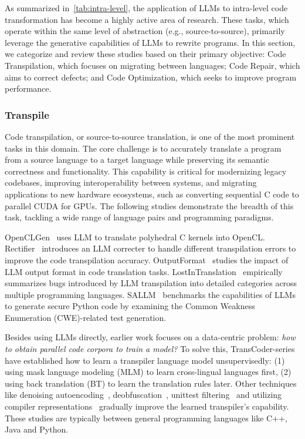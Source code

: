 \documentclass[pdflatex,sn-mathphys-ay,twocolumn, a4paper]{sn-jnl}%
\theoremstyle{thmstyleone}%
\theoremstyle{thmstyletwo}%
\theoremstyle{thmstylethree}%
\begin{document}
As summarized in~\autoref{tab:intra-level}, the application of LLMs to intra-level code transformation has become a highly active area of research. These tasks, which operate within the same level of abstraction (e.g., source-to-source), primarily leverage the generative capabilities of LLMs to rewrite programs. In this section, we categorize and review these studies based on their primary objective: Code Transpilation, which focuses on migrating between languages; Code Repair, which aims to correct defects; and Code Optimization, which seeks to improve program performance.

\subsubsection{Transpile}

Code transpilation, or source-to-source translation, is one of the most prominent tasks in this domain. The core challenge is to accurately translate a program from a source language to a target language while preserving its semantic correctness and functionality. This capability is critical for modernizing legacy codebases, improving interoperability between systems, and migrating applications to new hardware ecosystems, such as converting sequential C code to parallel CUDA for GPUs. The following studies demonstrate the breadth of this task, tackling a wide range of language pairs and programming paradigms.

OpenCLGen~\citep{74_palkowski2024automatic} uses LLM to translate polyhedral C kernels into OpenCL.
Rectifier~\citep{84_yin2024rectifier} introduces an LLM correcter to handle different transpilation errors to improve the code transpilation accuracy.
OutputFormat~\citep{95_macedo2024exploring} studies the impact of LLM output format in code translation tasks.
LostInTranslation~\citep{99_pan2024_ICSE} empirically summarizes bugs introduced by LLM transpilation into detailed categories across multiple programming languages.
SALLM~\citep{146_sallm_asew} benchmarks the capabilities of LLMs to generate secure Python code by examining the Common Weakness Enumeration (CWE)-related test generation.

Besides using LLMs directly, earlier work focuses on a data-centric problem: \textit{how to obtain parallel code corpora to train a model? }
To solve this, TransCoder-series~\citep{177_transcoder, 176_dobf, 175_transcoderst,154_transcoderir2023_iclr} have established how to learn a transpiler language model unsupervisedly: (1) using mask language modeling (MLM) to learn cross-lingual languages first, (2) using back translation (BT) to learn the translation rules later. Other techniques like denoising autoencoding~\citep{177_transcoder}, deobfuscation~\citep{176_dobf}, unittest filtering~\citep{175_transcoderst} and utilizing compiler representations~\citep{154_transcoderir2023_iclr} gradually improve the learned transpiler's capability. These studies are typically between general programming languages like C++, Java and Python.
\end{document}
